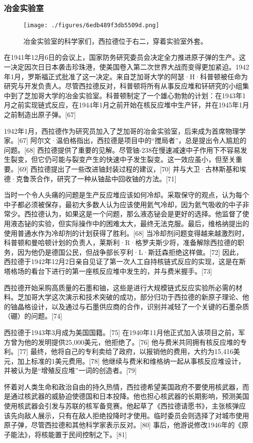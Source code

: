 \subsubsection{冶金实验室}
\begin{figure}[ht]
\centering
\texttt{[image: ./figures/6edb489f3db5509d.png]}
\caption{冶金实验室的科学家们，西拉德位于右二，穿着实验室外套。} \label{fig_Szilar_5}
\end{figure}
在1941年12月6日的会议上，国家防务研究委员会决定全力推进原子弹的生产。这一决定因次日日本袭击珍珠港，使美国卷入第二次世界大战而变得更加紧迫。1942年1月，罗斯福正式批准了这一决定。来自芝加哥大学的阿瑟·H·科普顿被任命为研究与开发负责人。尽管西拉德反对，科普顿将所有从事反应堆和钚研究的小组集中到了芝加哥大学的冶金实验室。科普顿制定了一个雄心勃勃的计划：在1943年1月之前实现链式反应，在1944年1月之前开始在核反应堆中生产钚，并在1945年1月之前制造出原子弹。[67]

1942年1月，西拉德作为研究员加入了芝加哥的冶金实验室，后来成为首席物理学家。[67] 阿尔文·温伯格指出，西拉德是项目中的“搅局者”，总是提出令人尴尬的问题。[68] 西拉德提供了重要的见解。尽管铀-238在慢速减速中子作用下不容易发生裂变，但它仍可能与裂变产生的快速中子发生裂变。这一效应虽小，但至关重要。[69] 西拉德提出了一些改进铀封装过程的建议，[70] 并与大卫·古林斯基和埃德·克鲁茨合作，研究了一种从铀盐中回收铀的方法。[71]

当时一个令人头痛的问题是生产反应堆应该如何冷却。采取保守的观点，认为每个中子都必须被保存，最初大多数人认为应该使用氦气冷却，因为氦气吸收的中子非常少。西拉德认为，如果这是一个问题，那么液态铋会是更好的选择。他监督了使用液态铋的实验，但实际操作中的困难太大，最终无法克服。最后，维格纳提出的使用普通水作为冷却剂的计划获得了胜利。[68] 当冷却剂问题变得越来越激烈时，科普顿和曼哈顿计划的负责人，莱斯利·R·格罗夫斯少将，准备解除西拉德的职务，因为他仍是德国公民，但战争部长亨利·L·斯廷森拒绝这样做。[72] 因此，西拉德于1942年12月2日亲自见证了第一次人工自持核链式反应的实现，这是在斯塔格场的看台下进行的第一座核反应堆中发生的，并与费米握手。[73]

西拉德开始采购高质量的石墨和铀，这些是进行大规模链式反应实验所必需的材料。芝加哥大学这次演示和技术突破的成功，部分归功于西拉德的新原子理论、他的铀晶格设计，以及通过与石墨供应商的合作，识别并减轻了一个关键的石墨杂质（硼）的问题。[74]

西拉德于1943年3月成为美国国籍。[75] 在1940年11月他正式加入该项目之前，军方曾为他的发明提供25,000美元，他拒绝了。[76] 他与费米共同拥有核反应堆的专利。[77] 最终，他将自己的专利卖给了政府，以报销他的费用，大约为15,416美元，加上标准的1美元费用。[78] 他继续与费米和维格纳一起从事核反应堆设计，并被认为是“增殖反应堆”一词的创造者。[79]

怀着对人类生命和政治自由的持久热情，西拉德希望美国政府不要使用核武器，而是通过核武器的威胁迫使德国和日本投降。他也担心核武器的长期影响，预测美国使用核武器会引发与苏联的核军备竞赛。他起草了《西拉德请愿书》，主张核弹应该先向敌人展示，只有在敌人拒绝投降时才使用。临时委员会则选择了对城市使用原子弹，尽管西拉德和其他科学家表示反对。[80] 事后，他游说修改1946年的《原子能法》，将核能置于民间控制之下。[81]